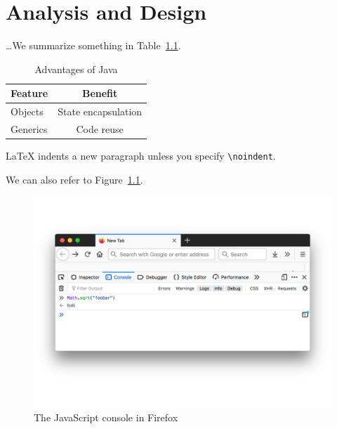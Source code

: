 \chapter{Analysis and Design}
\label{chap:analysis-and-design}


\bigskip

\dots We summarize something in Table~\ref{tab:java-advantages}.

\begin{table}[tb] %
  \centering
  \begin{tabular}{l c}  %
    Feature  & Benefit
 \\\hline
    Objects  & State encapsulation
 \\
    Generics & Code reuse
  \end{tabular}
  \caption{Advantages of Java}
  \label{tab:java-advantages}
\end{table}

\bigskip

\noindent
LaTeX indents a new paragraph unless you specify \lstinline{\noindent}.

\bigskip

We can also refer to Figure~\ref{fig:firefox-js-console}.

\begin{figure}[tb] %
  \centering
  \includegraphics[width=.9\linewidth]{firefox-js-console}
  \caption{The JavaScript console in Firefox }
  \label{fig:firefox-js-console}
\end{figure}
